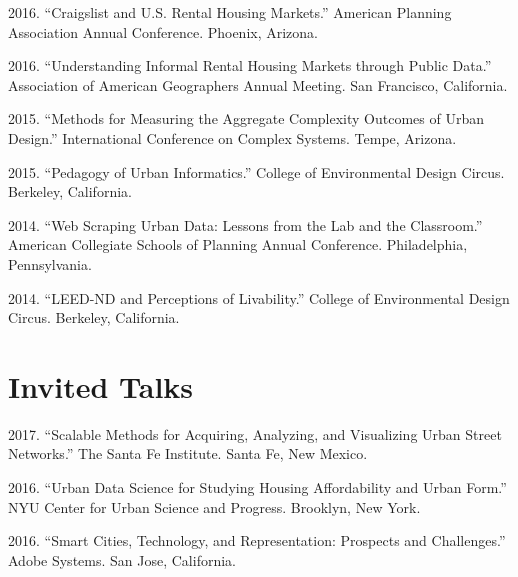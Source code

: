 \documentclass[11pt,letterpaper]{report}
\renewenvironment{itemize}{
  \begin{list}{}{
      \setlength{\leftmargin}{1.75em}
      \setlength{\itemsep}{0.25em}
      \setlength{\parskip}{0em}
      \setlength{\parsep}{0.25em}
    }
}{
  \end{list}
}
\begin{document}
\begin{itemize}

\item 2016. \enquote{Craigslist and U.S. Rental Housing Markets.} American Planning Association Annual Conference. Phoenix, Arizona.

\item 2016. \enquote{Understanding Informal Rental Housing Markets through Public Data.} Association of American Geographers Annual Meeting. San Francisco, California.

\item 2015. \enquote{Methods for Measuring the Aggregate Complexity Outcomes of Urban Design.} International Conference on Complex Systems. Tempe, Arizona.

\item 2015. \enquote{Pedagogy of Urban Informatics.} College of Environmental Design Circus. Berkeley, California.

\item 2014. \enquote{Web Scraping Urban Data: Lessons from the Lab and the Classroom.} American Collegiate Schools of Planning Annual Conference. Philadelphia, Pennsylvania.

\item 2014. \enquote{LEED-ND and Perceptions of Livability.} College of Environmental Design Circus. Berkeley, California.

\end{itemize}



\section*{Invited Talks}

\begin{itemize}

\item 2017. \enquote{Scalable Methods for Acquiring, Analyzing, and Visualizing Urban Street Networks.} The Santa Fe Institute. Santa Fe, New Mexico.

\item 2016. \enquote{Urban Data Science for Studying Housing Affordability and Urban Form.} NYU Center for Urban Science and Progress. Brooklyn, New York.

\item 2016. \enquote{Smart Cities, Technology, and Representation: Prospects and Challenges.} Adobe Systems. San Jose, California.

\end{itemize}
\end{document}
